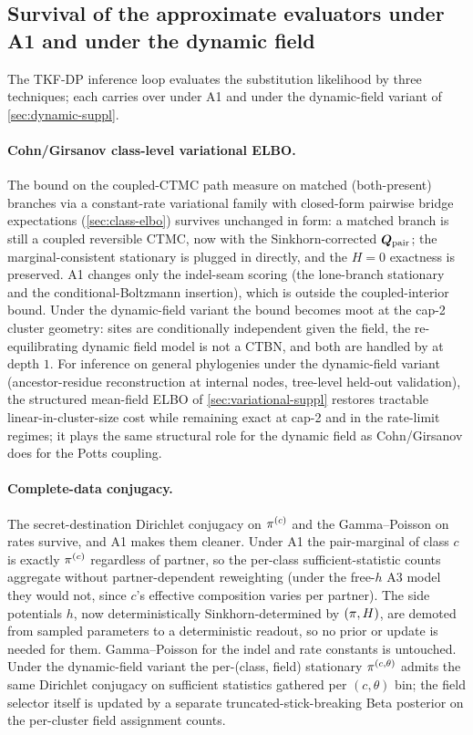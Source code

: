 \subsection{Survival of the approximate evaluators under A1 and under the dynamic field}
\label{sec:approx-suppl}

The TKF-DP inference loop evaluates the substitution likelihood by
three techniques; each carries over under A1 and under the
dynamic-field variant of \autoref{sec:dynamic-suppl}.

\paragraph{Cohn/Girsanov class-level variational ELBO.} The bound
on the coupled-CTMC path measure on matched (both-present) branches
via a constant-rate variational family with closed-form pairwise
bridge expectations (\autoref{sec:class-elbo}) survives unchanged
in form: a matched branch is still a coupled reversible CTMC, now
with the Sinkhorn-corrected $\bm{Q}_{\mathrm{pair}}$; the
marginal-consistent stationary is plugged in directly, and the
$H=0$ exactness is preserved. A1 changes only the indel-seam
scoring (the lone-branch stationary and the conditional-Boltzmann
insertion), which is outside the coupled-interior bound. Under the
dynamic-field variant the bound becomes moot at the cap-2 cluster
geometry: sites are conditionally independent given the field, the
re-equilibrating dynamic field model is not a CTBN, and both are
handled by  at depth $1$. For inference on
general phylogenies under the dynamic-field variant
(ancestor-residue reconstruction at internal nodes, tree-level
held-out validation), the structured mean-field ELBO of
\autoref{sec:variational-suppl} restores tractable
linear-in-cluster-size cost while remaining exact at cap-2 and in
the rate-limit regimes; it plays the same structural role for the
dynamic field as Cohn/Girsanov does for the Potts coupling.

\paragraph{Complete-data conjugacy.} The secret-destination
Dirichlet conjugacy on $\pi^{(c)}$ and the Gamma--Poisson on rates
survive, and A1 makes them cleaner. Under A1 the pair-marginal of
class $c$ is exactly $\pi^{(c)}$ regardless of partner, so the
per-class sufficient-statistic counts aggregate without
partner-dependent reweighting (under the free-$h$ A3 model they
would not, since $c$'s effective composition varies per partner).
The side potentials $h$, now deterministically Sinkhorn-determined
by $(\pi,H)$, are demoted from sampled parameters to a
deterministic readout, so no prior or update is needed for them.
Gamma--Poisson for the indel and rate constants is untouched.
Under the dynamic-field variant the per-(class, field) stationary
$\pi^{(c,\theta)}$ admits the same Dirichlet conjugacy on sufficient
statistics gathered per $(c,\theta)$ bin; the field selector itself
is updated by a separate truncated-stick-breaking Beta posterior on
the per-cluster field assignment counts.

